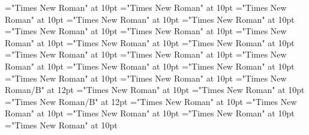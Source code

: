\documentclass[gps1,twoside]{article}
\begin{document}
\font\summarycomplexformentryrefcomplexformentryrefsminorentrycomplexbefore="Times New Roman" at 10pt
\font\spansummarycomplexformentryrefcomplexformentryrefsminorentrycomplexfirstchildbefore="Times New Roman" at 10pt
\font\nontrivialentryrootnontrivialentryrootnontrivialentryrootscomplexformentryrefcomplexformentryrefsminorentrycomplexbefore="Times New Roman" at 10pt
\font\nontrivialentryrootscomplexformentryrefcomplexformentryrefsminorentrycomplexbefore="Times New Roman" at 10pt
\font\summarydefinitionminorentrycomplexbefore="Times New Roman" at 10pt
\font\spansummarydefinitionminorentrycomplexfirstchildbefore="Times New Roman" at 10pt
\font\spansummarydefinitionminorentrycomplexlastchildafter="Times New Roman" at 10pt
\font\visiblecomplexformbackrefsminorentrycomplexbefore="Times New Roman" at 10pt
\font\visiblecomplexformbackrefsminorentrycomplexafter="Times New Roman" at 10pt
\font\complexformtypesvisiblecomplexformbackrefvisiblecomplexformbackrefsminorentrycomplexafter="Times New Roman" at 10pt
\font\reverseabbrcomplexformtypecomplexformtypesvisiblecomplexformbackrefvisiblecomplexformbackrefsminorentrycomplexbefore="Times New Roman" at 10pt
\font\headwordvisiblecomplexformbackrefvisiblecomplexformbackrefsminorentrycomplexbefore="Times New Roman" at 10pt
\font{}="Times New Roman" at 10pt
\font{}="Times New Roman" at 10pt
\font\owningentrysummarydefinitionvisiblecomplexformbackrefvisiblecomplexformbackrefsminorentrycomplexbefore="Times New Roman" at 10pt
\font\spanowningentrysummarydefinitionvisiblecomplexformbackrefvisiblecomplexformbackrefsminorentrycomplexfirstchildbefore="Times New Roman" at 10pt
\font\spanowningentrysummarydefinitionvisiblecomplexformbackrefvisiblecomplexformbackrefsminorentrycomplexlastchildafter="Times New Roman" at 10pt
\font\spanbzhheadwordminorentryvariant="Times New Roman/B" at 12pt
\font\headwordminorentryvariantbefore="Times New Roman" at 10pt
\font\spanheadwordminorentryvariantlastchildafter="Times New Roman" at 10pt
\font\spanheadwordminorentryvariant="Times New Roman/B" at 12pt
\font\pronunciationpronunciationpronunciationsminorentryvariantbefore="Times New Roman" at 10pt
\font\pronunciationsminorentryvariantafter="Times New Roman" at 10pt
\font\formpronunciationpronunciationsminorentryvariantbefore="Times New Roman" at 10pt
\font\spanformpronunciationpronunciationsminorentryvariantfirstchildbefore="Times New Roman" at 10pt
\font\spanformpronunciationpronunciationsminorentryvariantlastchildafter="Times New Roman" at 10pt
\end{document}
